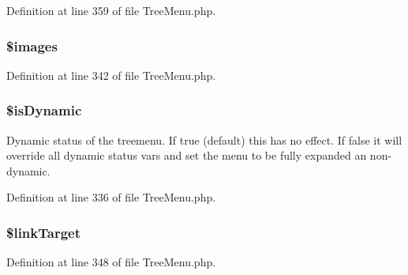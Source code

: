 \-Definition at line 359 of file \-Tree\-Menu.\-php.

\hypertarget{class_h_t_m_l___tree_menu___d_h_t_m_l_ab0c7013419fc5ee6238d17eff2554afe}{
\subsubsection[{\$images}]{\setlength{\rightskip}{0pt plus 5cm}\$images}}\label{class_h_t_m_l___tree_menu___d_h_t_m_l_ab0c7013419fc5ee6238d17eff2554afe}


\-Definition at line 342 of file \-Tree\-Menu.\-php.

\hypertarget{class_h_t_m_l___tree_menu___d_h_t_m_l_aa927a23cfdd5d6ac3df6fc7eedd64475}{
\subsubsection[{\$is\-Dynamic}]{\setlength{\rightskip}{0pt plus 5cm}\$is\-Dynamic}}\label{class_h_t_m_l___tree_menu___d_h_t_m_l_aa927a23cfdd5d6ac3df6fc7eedd64475}
\-Dynamic status of the treemenu. \-If true (default) this has no effect. \-If false it will override all dynamic status vars and set the menu to be fully expanded an non-\/dynamic. 

\-Definition at line 336 of file \-Tree\-Menu.\-php.

\hypertarget{class_h_t_m_l___tree_menu___d_h_t_m_l_abc92a826d3c81eded7a4f7eac934f348}{
\subsubsection[{\$link\-Target}]{\setlength{\rightskip}{0pt plus 5cm}\$link\-Target}}\label{class_h_t_m_l___tree_menu___d_h_t_m_l_abc92a826d3c81eded7a4f7eac934f348}


\-Definition at line 348 of file \-Tree\-Menu.\-php.

